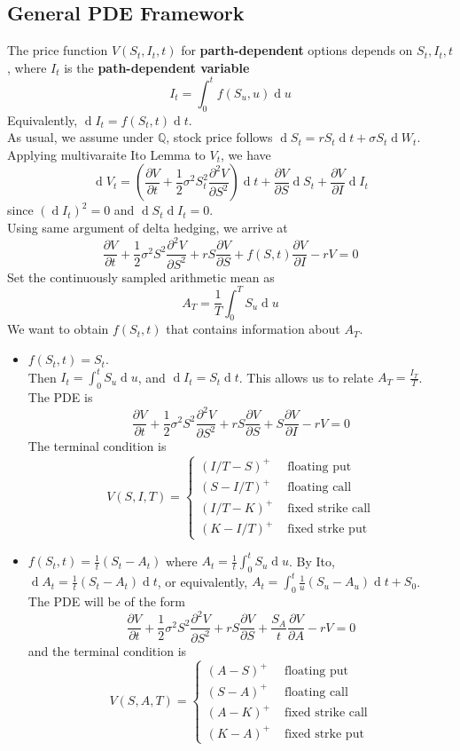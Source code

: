\documentclass[12pt]{article}
\theoremstyle{definition}
\DeclareMathOperator{\diff}{d}
\begin{document}
\subsection{General PDE Framework}
The price function $V(S_t,I_t,t)$ for \textbf{parth-dependent} options depends on $S_t, I_t, t$, where $I_t$ is the \textbf{path-dependent variable}
\[
I_t=\int_0^t f(S_u,u)\diff u
\]
Equivalently, $\diff I_t=f(S_t,t)\diff t$.\\
As usual, we assume under $\mathbb{Q}$, stock price follows $\diff S_t=rS_t\diff t+\sigma S_t\diff W_t$.\\
Applying multivaraite Ito Lemma to $V_t$, we have
\[
\diff V_t=(\frac{\partial V}{\partial t}+\frac{1}{2}\sigma^2 S_t^2\frac{\partial^2 V}{\partial S^2})\diff t + \frac{\partial V}{\partial S}\diff S_t+\frac{\partial V}{\partial I}\diff I_t
\]
since $(\diff I_t)^2=0$ and $\diff S_t\diff I_t=0$.\\
Using same argument of delta hedging, we arrive at
\[
\frac{\partial V}{\partial t}+\frac{1}{2}\sigma^2 S^2\frac{\partial^2 V}{\partial S^2}+rS\frac{\partial V}{\partial S}+f(S,t)\frac{\partial V}{\partial I}-rV=0
\]
Set the continuously sampled arithmetic mean as 
\[
A_T=\frac{1}{T}\int_0^T S_u\diff u
\]
We want to obtain $f(S_t,t)$ that contains information about $A_T$.
\begin{itemize}
  \item $f(S_t,t)=S_t$.\\Then $I_t=\int_0^t S_u\diff u$, and $\diff I_t=S_t\diff t$. This allows us to relate $A_T=\frac{I_T}{T}$.\\
  The PDE is
  \[
\frac{\partial V}{\partial t}+\frac{1}{2}\sigma^2 S^2\frac{\partial^2 V}{\partial S^2}+rS\frac{\partial V}{\partial S}+S\frac{\partial V}{\partial I}-rV=0
  \]
  The terminal condition is 
  \[
V(S,I,T)=\begin{cases}
(I/T-S)^{+} & \text{ floating put}\\
(S-I/T)^{+} & \text{ floating call}\\
(I/T-K)^{+} & \text{ fixed strike call}\\
(K-I/T)^{+} & \text{ fixed strke put}
\end{cases}
  \]
  \item $f(S_t,t)=\frac{1}{t}(S_t-A_t)$ where $A_t=\frac{1}{t}\int_0^t S_u\diff u$. By Ito, $\diff A_t=\frac{1}{t}(S_t-A_t)\diff t$, or equivalently, $A_t=\int_0^t\frac{1}{u}(S_u-A_u)\diff t+S_0$.\\
  The PDE will be of the form
  \[
\frac{\partial V}{\partial t}+\frac{1}{2}\sigma^2 S^2\frac{\partial^2 V}{\partial S^2}+rS\frac{\partial V}{\partial S}+\frac{S_A}{t}\frac{\partial V}{\partial A}-rV=0
  \]
  and the terminal condition is
  \[
V(S,A,T)=\begin{cases}
(A-S)^{+} & \text{ floating put}\\
(S-A)^{+} & \text{ floating call}\\
(A-K)^{+} & \text{ fixed strike call}\\
(K-A)^{+} & \text{ fixed strke put}
\end{cases}
  \]
\end{itemize}
\end{document}
